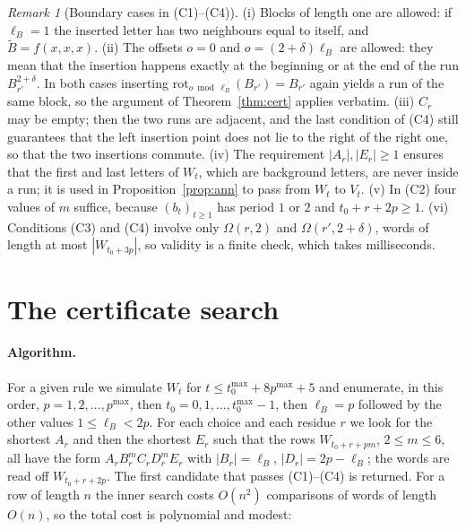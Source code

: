 \documentclass[11pt]{article}
\theoremstyle{definition}
\theoremstyle{remark}
\newtheorem{remark}[theorem]{Remark}
\begin{document}
\begin{remark}[Boundary cases in (C1)--(C4)]\label{rem:edge}
(i) Blocks of length one are allowed: if $\ell_B=1$ the inserted letter has two neighbours equal to itself, and $\widetilde B=f(x,x,x)$. (ii) The offsets $o=0$ and $o=(2+\delta)\ell_B$ are allowed: they mean that the insertion happens exactly at the beginning or at the end of the run $B_{r'}^{2+\delta}$. In both cases inserting $\mathrm{rot}_{o\bmod\ell_B}(B_{r'})=B_{r'}$ again yields a run of the same block, so the argument of Theorem~\ref{thm:cert} applies verbatim. (iii) $C_r$ may be empty; then the two runs are adjacent, and the last condition of (C4) still guarantees that the left insertion point does not lie to the right of the right one, so that the two insertions commute. (iv) The requirement $|A_r|,|E_r|\ge1$ ensures that the first and last letters of $W_t$, which are background letters, are never inside a run; it is used in Proposition~\ref{prop:ann} to pass from $W_t$ to $V_t$. (v) In (C2) four values of $m$ suffice, because $(b_t)_{t\ge1}$ has period $1$ or $2$ and $t_0+r+2p\ge1$. (vi) Conditions (C3) and (C4) involve only $\Omega(r,2)$ and $\Omega(r',2+\delta)$, words of length at most $|W_{t_0+3p}|$, so validity is a finite check, which takes milliseconds.
\end{remark}

\section{The certificate search}\label{sec:search}

\paragraph{Algorithm.} For a given rule we simulate $W_t$ for $t\le t_0^{\max}+8p^{\max}+5$ and enumerate, in this order, $p=1,2,\dots,p^{\max}$, then $t_0=0,1,\dots,t_0^{\max}-1$, then $\ell_B=p$ followed by the other values $1\le\ell_B<2p$. For each choice and each residue $r$ we look for the shortest $A_r$ and then the shortest $E_r$ such that the rows $W_{t_0+r+pm}$, $2\le m\le 6$, all have the form $A_rB_r^mC_rD_r^mE_r$ with $|B_r|=\ell_B$, $|D_r|=2p-\ell_B$; the words are read off $W_{t_0+r+2p}$. The first candidate that passes (C1)--(C4) is returned. For a row of length $n$ the inner search costs $O(n^2)$ comparisons of words of length $O(n)$, so the total cost is polynomial and modest: %
\end{document}
